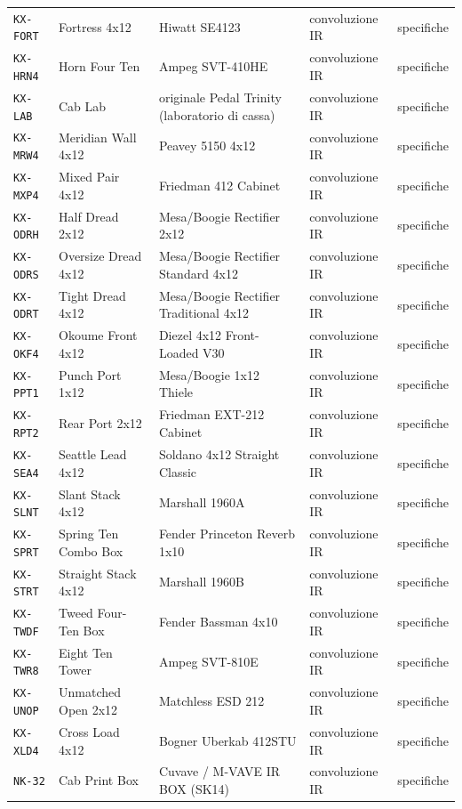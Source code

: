 \begin{xltabular}{\linewidth}{@{}l l X l l@{}}
\texttt{KX-FORT} & Fortress 4x12 & Hiwatt SE4123 & convoluzione IR & specifiche\\
\texttt{KX-HRN4} & Horn Four Ten & Ampeg SVT-410HE & convoluzione IR & specifiche\\
\texttt{KX-LAB} & Cab Lab & originale Pedal Trinity (laboratorio di cassa) & convoluzione IR & specifiche\\
\texttt{KX-MRW4} & Meridian Wall 4x12 & Peavey 5150 4x12 & convoluzione IR & specifiche\\
\texttt{KX-MXP4} & Mixed Pair 4x12 & Friedman 412 Cabinet & convoluzione IR & specifiche\\
\texttt{KX-ODRH} & Half Dread 2x12 & Mesa/Boogie Rectifier 2x12 & convoluzione IR & specifiche\\
\texttt{KX-ODRS} & Oversize Dread 4x12 & Mesa/Boogie Rectifier Standard 4x12 & convoluzione IR & specifiche\\
\texttt{KX-ODRT} & Tight Dread 4x12 & Mesa/Boogie Rectifier Traditional 4x12 & convoluzione IR & specifiche\\
\texttt{KX-OKF4} & Okoume Front 4x12 & Diezel 4x12 Front-Loaded V30 & convoluzione IR & specifiche\\
\texttt{KX-PPT1} & Punch Port 1x12 & Mesa/Boogie 1x12 Thiele & convoluzione IR & specifiche\\
\texttt{KX-RPT2} & Rear Port 2x12 & Friedman EXT-212 Cabinet & convoluzione IR & specifiche\\
\texttt{KX-SEA4} & Seattle Lead 4x12 & Soldano 4x12 Straight Classic & convoluzione IR & specifiche\\
\texttt{KX-SLNT} & Slant Stack 4x12 & Marshall 1960A & convoluzione IR & specifiche\\
\texttt{KX-SPRT} & Spring Ten Combo Box & Fender Princeton Reverb 1x10 & convoluzione IR & specifiche\\
\texttt{KX-STRT} & Straight Stack 4x12 & Marshall 1960B & convoluzione IR & specifiche\\
\texttt{KX-TWDF} & Tweed Four-Ten Box & Fender Bassman 4x10 & convoluzione IR & specifiche\\
\texttt{KX-TWR8} & Eight Ten Tower & Ampeg SVT-810E & convoluzione IR & specifiche\\
\texttt{KX-UNOP} & Unmatched Open 2x12 & Matchless ESD 212 & convoluzione IR & specifiche\\
\texttt{KX-XLD4} & Cross Load 4x12 & Bogner Uberkab 412STU & convoluzione IR & specifiche\\
\texttt{NK-32} & Cab Print Box & Cuvave / M-VAVE IR BOX (SK14) & convoluzione IR & specifiche\\

\end{xltabular}
